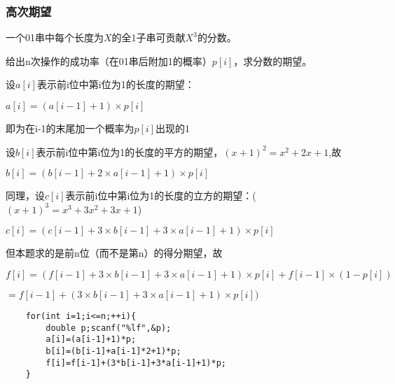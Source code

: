 \documentclass[UTF8]{ctexart}
\begin{document}
\subsubsection{高次期望}
一个01串中每个长度为$X$的全1子串可贡献$X^3$的分数。

给出n次操作的成功率（在01串后附加1的概率）$p[i]$，求分数的期望。

设$a[i]$表示前i位中第i位为1的长度的期望：

$a[i]=(a[i−1]+1)×p[i]$

即为在i-1的末尾加一个概率为$p[i]$出现的1

设$b[i]$表示前i位中第i位为1的长度的平方的期望，$(x+1)^2=x^2+2x+1$,故

$b[i]=(b[i−1]+2×a[i−1]+1)×p[i]$

同理，设$c[i]$表示前i位中第i位为1的长度的立方的期望：($(x+1)^3=x^3+3x^2+3x+1$)

$c[i]=(c[i−1]+3×b[i−1]+3×a[i−1]+1)×p[i]$

但本题求的是前n位（而不是第n）的得分期望，故

$f[i]=(f[i−1]+3×b[i−1]+3×a[i−1]+1)×p[i]+f[i-1]×(1-p[i])$


$=f[i-1]+(3×b[i−1]+3×a[i−1]+1)×p[i])$
\begin{lstlisting}
    for(int i=1;i<=n;++i){
		double p;scanf("%lf",&p);
		a[i]=(a[i-1]+1)*p;
		b[i]=(b[i-1]+a[i-1]*2+1)*p;
		f[i]=f[i-1]+(3*b[i-1]+3*a[i-1]+1)*p;
	}  
\end{lstlisting}
\end{document}
